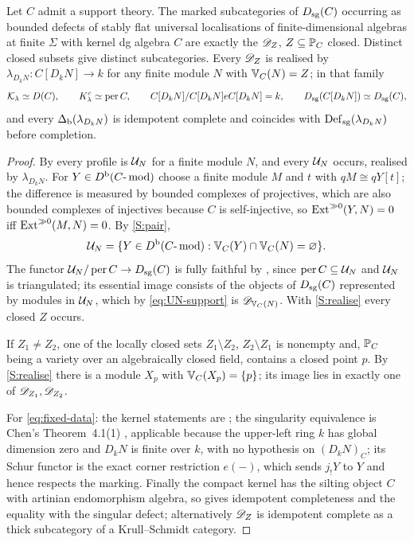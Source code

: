\begin{theorem}\label{thm:support-classification}
Let \(C\) admit a support theory.  The marked subcategories of \(D_{\mathrm{sg}}(C)\) occurring as bounded defects of stably flat universal localisations of finite-dimensional algebras at finite \(\Sigma\) with kernel dg algebra \(C\) are exactly the \(\mathscr D_Z\), \(Z\subseteq\mathbb P_C\) closed.  Distinct closed subsets give distinct subcategories.  Every \(\mathscr D_Z\) is realised by \(\lambda_{D_kN}:C[D_kN]\to k\) for any finite module \(N\) with \(\mathbb V_C(N)=Z\); in that family
\begin{equation}\label{eq:fixed-data}
 \mathcal K_{\lambda}\simeq D(C),\qquad K^c_\lambda\simeq\operatorname{per} C,\qquad C[D_kN]/C[D_kN]eC[D_kN]=k,\qquad D_{\mathrm{sg}}(C[D_kN])\simeq D_{\mathrm{sg}}(C),
\end{equation}
and every \(\Delta_{\mathrm b}(\lambda_{D_kN})\) is idempotent complete and coincides with \(\operatorname{Def}_{\mathrm{sg}}(\lambda_{D_kN})\) before completion.
\end{theorem}

\begin{proof}
By  every profile is \(\mathcal U_N\) for a finite module \(N\), and every \(\mathcal U_N\) occurs, realised by \(\lambda_{D_kN}\).  For \(Y\in D^{\mathrm b}(C\text{-}\operatorname{mod})\) choose a finite module \(M\) and \(t\) with \(qM\cong qY[t]\); the difference is measured by bounded complexes of projectives, which are also bounded complexes of injectives because \(C\) is self-injective, so \(\operatorname{Ext}^{\gg0}(Y,N)=0\) iff \(\operatorname{Ext}^{\gg0}(M,N)=0\).  By \ref{S:pair},
\begin{equation}\label{eq:UN-support}
 \mathcal U_N=\{Y\in D^{\mathrm b}(C\text{-}\operatorname{mod}):\mathbb V_C(Y)\cap\mathbb V_C(N)=\varnothing\}.
\end{equation}
The functor \(\mathcal U_N/\operatorname{per} C\to D_{\mathrm{sg}}(C)\) is fully faithful by , since \(\operatorname{per} C\subseteq\mathcal U_N\) and \(\mathcal U_N\) is triangulated; its essential image consists of the objects of \(D_{\mathrm{sg}}(C)\) represented by modules in \(\mathcal U_N\), which by \eqref{eq:UN-support} is \(\mathscr D_{\mathbb V_C(N)}\).  With \ref{S:realise} every closed \(Z\) occurs.

If \(Z_1\ne Z_2\), one of the locally closed sets \(Z_1\setminus Z_2\), \(Z_2\setminus Z_1\) is nonempty and, \(\mathbb P_C\) being a variety over an algebraically closed field, contains a closed point \(p\).  By \ref{S:realise} there is a module \(X_p\) with \(\mathbb V_C(X_p)=\{p\}\); its image lies in exactly one of \(\mathscr D_{Z_1},\mathscr D_{Z_2}\).

For \eqref{eq:fixed-data}: the kernel statements are ; the singularity equivalence is Chen's Theorem~4.1(1) \cite{ChenSchur09}, applicable because the upper-left ring \(k\) has global dimension zero and \(D_kN\) is finite over \(k\), with no hypothesis on \((D_kN)_C\); its Schur functor is the exact corner restriction \(e(-)\), which sends \(j_!Y\) to \(Y\) and hence respects the marking.  Finally the compact kernel has the silting object \(C\) with artinian endomorphism algebra, so  gives idempotent completeness and the equality with the singular defect; alternatively \(\mathscr D_Z\) is idempotent complete as a thick subcategory of a Krull--Schmidt category.
\end{proof}

